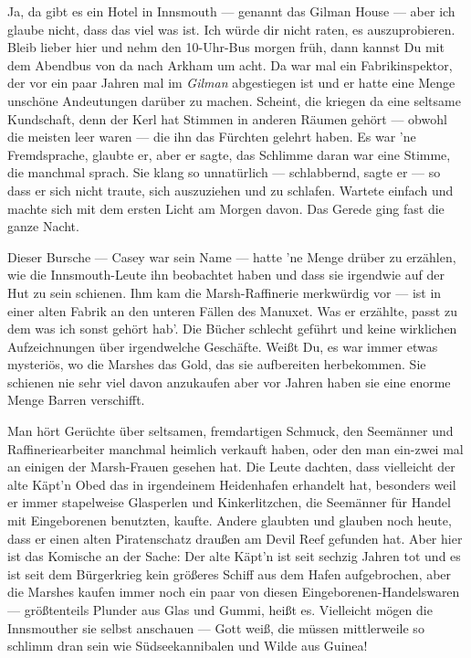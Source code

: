 Ja, da gibt es ein Hotel in Innsmouth --- genannt das Gilman House --- aber ich glaube nicht, dass das viel was ist. Ich würde dir nicht raten, es auszuprobieren. Bleib lieber hier und nehm den 10-Uhr-Bus morgen früh, dann kannst Du mit dem Abendbus von da nach Arkham um acht. Da war mal ein Fabrikinspektor, der vor ein paar Jahren mal im \textit{Gilman} abgestiegen ist und er hatte eine Menge unschöne Andeutungen darüber zu machen. Scheint, die kriegen da eine seltsame Kundschaft, denn der Kerl hat Stimmen in anderen Räumen gehört --- obwohl die meisten leer waren --- die ihn das Fürchten gelehrt haben. Es war 'ne Fremdsprache, glaubte  er, aber er sagte, das Schlimme daran war eine Stimme, die manchmal sprach. Sie klang so unnatürlich --- schlabbernd, sagte er --- so dass er sich nicht traute, sich auszuziehen und zu schlafen. Wartete einfach und machte sich mit dem ersten Licht am Morgen davon. Das Gerede ging fast die ganze Nacht.

Dieser Bursche --- Casey war sein Name --- hatte 'ne Menge drüber zu erzählen, wie die Innsmouth-Leute ihn beobachtet haben und dass sie irgendwie auf der Hut zu sein schienen. Ihm kam die Marsh-Raffinerie merkwürdig vor --- ist in einer alten Fabrik an den unteren Fällen des Manuxet. Was er erzählte, passt zu dem was ich sonst gehört hab'. Die Bücher schlecht geführt und keine wirklichen Aufzeichnungen über irgendwelche Geschäfte. Weißt Du, es war immer etwas mysteriös, wo die Marshes das Gold, das sie aufbereiten herbekommen. Sie schienen nie sehr viel davon anzukaufen aber vor Jahren haben sie eine enorme Menge Barren verschifft.

Man hört Gerüchte über seltsamen, fremdartigen Schmuck, den Seemänner und Raffineriearbeiter manchmal heimlich verkauft haben, oder den man ein-zwei mal an einigen der Marsh-Frauen gesehen hat. Die Leute dachten, dass vielleicht der alte Käpt'n Obed das in irgendeinem Heidenhafen erhandelt hat, besonders weil er immer stapelweise Glasperlen und Kinkerlitzchen, die Seemänner für Handel mit Eingeborenen benutzten, kaufte. Andere glaubten und glauben noch heute, dass er einen alten Piratenschatz draußen am Devil Reef gefunden hat. Aber hier ist das Komische an der Sache: Der alte Käpt'n ist seit sechzig Jahren tot und es ist seit dem Bürgerkrieg kein größeres Schiff aus dem Hafen aufgebrochen, aber die Marshes kaufen immer noch ein paar von diesen Eingeborenen-Handelswaren --- größtenteils Plunder aus Glas und Gummi, heißt es. Vielleicht mögen die Innsmouther sie selbst anschauen --- Gott weiß, die müssen mittlerweile so schlimm dran sein wie Südseekannibalen und Wilde aus Guinea!

